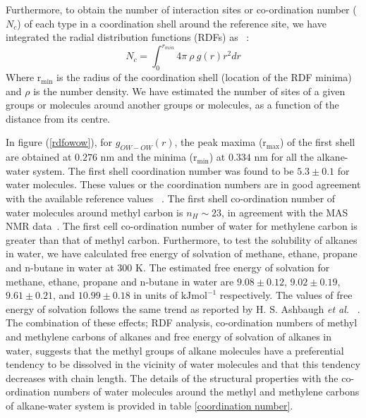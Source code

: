  Furthermore, to obtain the number of interaction sites or co-ordination number ($N_c$) of each type in a coordination shell around the reference site,  we have integrated the
radial distribution functions (RDFs) as~ \citep{mcquarrie2000}:
\begin{equation}
N_c = \int_0^{r_{min}} 4\pi~ \rho~ g(r) r^2 dr
\end{equation}
Where $\mathrm{r_{min}}$ is the radius of the coordination shell  (location of the RDF minima) and $\rho$ is the number density. We have estimated the number of sites of a given groups or molecules around another groups or molecules, as a function of the distance from its centre. 

 In figure (\ref{rdfowow}), for $g_{OW-OW}(r)$, the peak maxima ($\mathrm{r_{max}}$) of the first shell are obtained at $0.276$ nm  and the minima ($\mathrm{r_{min}}$) at $0.334$ nm for  all the alkane-water system. The first shell coordination number was found to be $5.3\pm 0.1$ for water molecules. These values or the  coordination numbers are in good agreement  with the available reference values ~\citep{head2006tetrahedral,head2002water}. The first shell   co-ordination number of water molecules around  methyl carbon is $n_H\sim 23 $, in agreement with the MAS NMR data~\citep{koh2000water}. The first cell co-ordination number  of water for  methylene carbon is greater than that of methyl carbon. Furthermore, to test the solubility of alkanes in water, we have calculated free energy of solvation of methane, ethane, propane and n-butane in water at 300 K. The estimated free energy of solvation for methane, ethane, propane and n-butane in water are $9.08 \pm 0.12$, $9.02 \pm 0.19$, $9.61 \pm 0.21$, and $10.99 \pm 0.18$ in units of $\mathrm{kJmol}^{-1}$ respectively. The values of free energy of solvation follows the same trend as reported by H. S. Ashbaugh \emph{et al.} ~\citep{ashbaugh1998hydration}. The combination of these effects; RDF analysis, co-ordination numbers of methyl and methylene carbons of alkanes and free energy of solvation of alkanes in water, suggests that the methyl groups of alkane  molecules have a preferential tendency to be dissolved in the vicinity of water molecules and that this tendency decreases with chain length. The details of the structural properties with the co-ordination numbers of water molecules around the methyl and methylene carbons of alkane-water system is provided in table \ref{coordination number}.

